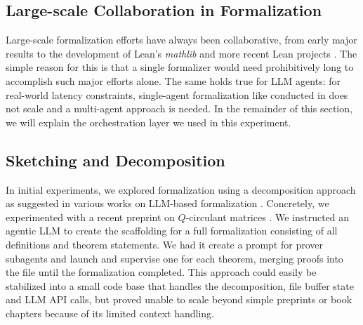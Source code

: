\documentclass[]{fairmeta}
\begin{document}
\subsection{Large-scale Collaboration in Formalization}
Large-scale formalization efforts have always been collaborative, from early major results
\citep[e.g.][]{gonthier2013oddorder,hales2017kepler}
to the development of Lean's \emph{mathlib} \citep{The_mathlib_Community_2020} and more recent Lean projects
\citep[e.g.][]{vandoorn2023sphereeversion,
commelin2023abstractionboundariesspecdriven,becker2025blueprintformalizationcarlesonstheorem}. The simple reason for this is that a single formalizer would need prohibitively long to accomplish such major efforts alone. The same holds true for LLM agents: for real-world latency constraints, single-agent formalization like conducted in \citep{urban2026130klinesformaltopology} does not scale and a multi-agent approach is needed. In the remainder of this section, we will explain the orchestration layer we used in this experiment.

\subsection{Sketching and Decomposition}
In initial experiments, we explored formalization using a decomposition approach as suggested in various works on LLM-based formalization \citep[e.g.][]{jiang2023draftsketchproveguiding,ren2025deepseekproverv2advancingformalmathematical}. Concretely, we experimented with a recent preprint on $Q$-circulant matrices \citep{li2026extension}. We instructed an agentic LLM to create the scaffolding for a full formalization consisting of all definitions and theorem statements.
We had it create a prompt for prover subagents and launch and supervise one for each theorem, merging proofs into the file until the formalization completed. This approach could easily be stabilized into a small code base that handles the decomposition, file buffer state and LLM API calls, but proved unable to scale beyond simple preprints or book chapters because of its limited context handling.
\end{document}
